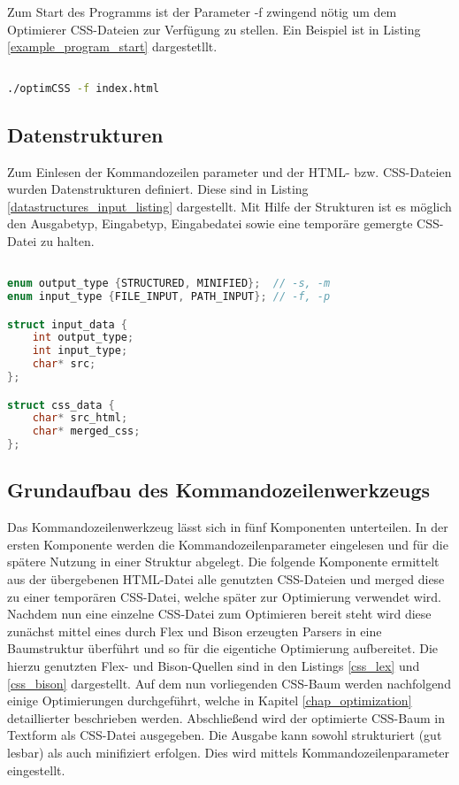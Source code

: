Zum Start des Programms ist der Parameter -f zwingend nötig um dem Optimierer CSS-Dateien zur Verfügung zu stellen. Ein Beispiel ist in Listing \ref{example_program_start} dargestetllt.

\begin{lstlisting}[label=example_program_start,language=Bash, caption=Programmstart]

./optimCSS -f index.html

\end{lstlisting}

\subsection{Datenstrukturen}

Zum Einlesen der Kommandozeilen parameter und der HTML- bzw. CSS-Dateien wurden Datenstrukturen definiert. Diese sind in Listing \ref{datastructures_input_listing} dargestellt.
Mit Hilfe der Strukturen ist es möglich den Ausgabetyp, Eingabetyp, Eingabedatei sowie eine temporäre gemergte CSS-Datei zu halten.

\begin{lstlisting}[label=datastructures_input_listing,language=C, caption=Datenstrukturen]

enum output_type {STRUCTURED, MINIFIED};  // -s, -m
enum input_type {FILE_INPUT, PATH_INPUT}; // -f, -p

struct input_data {
	int output_type;
	int input_type;
	char* src;
};

struct css_data {
	char* src_html;
	char* merged_css;
};

\end{lstlisting}


\subsection{Grundaufbau des Kommandozeilenwerkzeugs}
Das Kommandozeilenwerkzeug lässt sich in fünf Komponenten unterteilen. In der ersten Komponente werden die Kommandozeilenparameter eingelesen und für die spätere Nutzung in einer Struktur abgelegt.
Die folgende Komponente ermittelt aus der übergebenen HTML-Datei alle genutzten CSS-Dateien und merged diese zu einer temporären CSS-Datei, welche später zur Optimierung verwendet wird.
Nachdem nun eine einzelne CSS-Datei zum Optimieren bereit steht wird diese zunächst mittel eines durch Flex und Bison erzeugten Parsers in eine Baumstruktur überführt und so für die eigentiche Optimierung aufbereitet.
Die hierzu genutzten Flex- und Bison-Quellen sind in den Listings \ref{css_lex} und \ref{css_bison} dargestellt. 
Auf dem nun vorliegenden CSS-Baum werden nachfolgend einige Optimierungen durchgeführt, welche in Kapitel \ref{chap_optimization} detaillierter beschrieben werden.
Abschließend wird der optimierte CSS-Baum in Textform als CSS-Datei ausgegeben. Die Ausgabe kann sowohl strukturiert (gut lesbar) als auch minifiziert erfolgen. Dies wird mittels Kommandozeilenparameter eingestellt.



